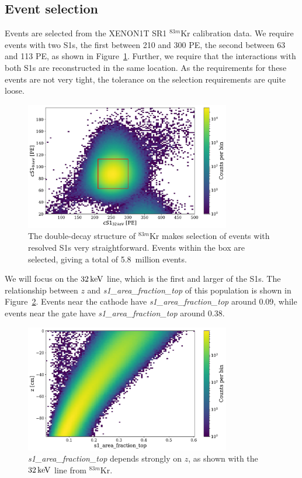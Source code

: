 \subsection{Event selection}

Events are selected from the XENON1T SR1 $^{83m}$Kr calibration data. We require events with two S1s, the first between 210 and 300 PE, the second between 63 and 113 PE, as shown in Figure~\ref{fig:s1a_s1b}. Further, we require that the interactions with both S1s are reconstructed in the same location. As the requirements for these events are not very tight, the tolerance on the selection requirements are quite loose.

\begin{figure}[htb]
    \centering
    \includegraphics[width=0.8\textwidth]{figures/s1aft/sr1_83mkr_s1s}
    \caption{The double-decay structure of $^{83m}$Kr makes selection of events with resolved S1s very straightforward. Events within the box are selected, giving a total of 5.8~million events.}\label{fig:s1a_s1b}
\end{figure}

We will focus on the $32\,\mathrm{keV}$ line, which is the first and larger of the S1s. The relationship between $z$ and \textit{s1\_area\_fraction\_top} of this population is shown in Figure~\ref{fig:z_aft}. Events near the cathode have \textit{s1\_area\_fraction\_top} around 0.09, while events near the gate have \textit{s1\_area\_fraction\_top} around 0.38.

\begin{figure}[htb]
\centering
    \includegraphics[width=0.8\textwidth]{figures/s1aft/z_s1aft}
    \caption{\textit{s1\_area\_fraction\_top} depends strongly on $z$, as shown with the $32\,\mathrm{keV}$ line from $^{83m}$Kr.}\label{fig:z_aft}
\end{figure}

